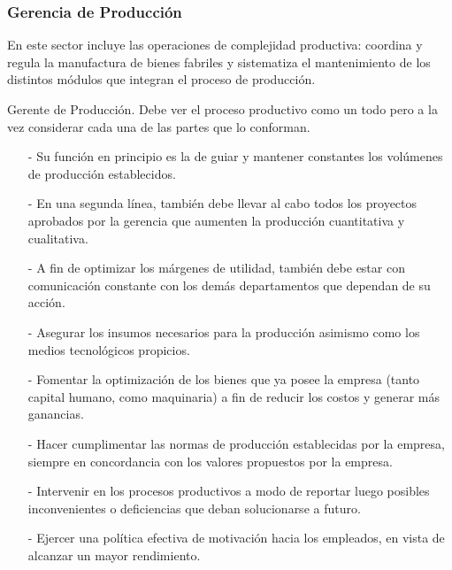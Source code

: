 \documentclass[a4paper,10pt,titlepage]{article}
\begin{document}

\newpage

\subsubsection{Gerencia de Producci\'on}
\smallskip
En este sector incluye las operaciones de complejidad productiva: coordina y regula la manufactura de bienes fabriles y sistematiza el mantenimiento de los distintos módulos que integran el proceso de producción.

{

Gerente de Producci\'on. Debe ver el proceso productivo como un todo pero a la vez considerar cada una de las partes que lo conforman.
}
{
\begin{itemize}
	\item[-] Su función en principio es la de guiar y mantener constantes los volúmenes de producción establecidos. 
	\item[-] En una segunda línea, también debe llevar al cabo todos los proyectos aprobados por la gerencia que aumenten la producción cuantitativa y cualitativa.  
	\item[-]A fin de optimizar los márgenes de utilidad, también debe estar con comunicación constante con los demás departamentos que dependan de su acción. 
	
\end{itemize}
}
{
\begin{itemize}
   \item[-] Asegurar los insumos necesarios para la producción asimismo como los medios tecnológicos propicios. 
   \item[-] Fomentar la optimización de los bienes que ya posee la empresa (tanto capital humano, como maquinaria) a fin de reducir los costos y generar más ganancias. 
   
\end{itemize}	
}
{
\begin{itemize}

   \item[-] Hacer cumplimentar las normas de producción establecidas por la empresa, siempre en concordancia con los valores propuestos por la empresa. 
   \item[-] Intervenir en los procesos productivos a modo de reportar luego posibles inconvenientes o deficiencias que deban solucionarse a futuro. 
   \item[-] Ejercer una política efectiva de motivaci\'on hacia los empleados, en vista de alcanzar un mayor rendimiento.

\end{itemize}
}
\end{document}
